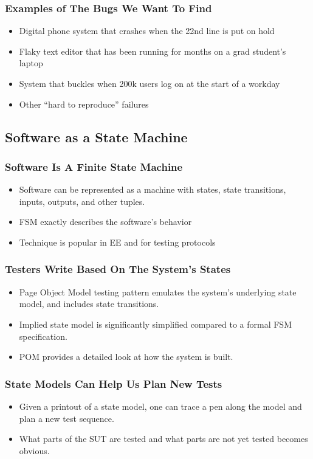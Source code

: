 \begin{frame}
  \frametitle{Examples of The Bugs We Want To Find}
  \begin{itemize}
    \item Digital phone system that crashes when the 22nd line is put on hold
    \item Flaky text editor that has been running for months on a grad student's laptop
    \item System that buckles when 200k users log on at the start of a workday
    \item Other ``hard to reproduce'' failures
  \end{itemize}
\end{frame}

\subsection{Software as a State Machine}
\begin{frame}
  \frametitle{Software Is A Finite State Machine}
  \begin{itemize}
    \item Software can be represented as a machine with states, state transitions, inputs, outputs, and other tuples.
    \item FSM exactly describes the software's behavior
    \item Technique is popular in EE and for testing protocols
  \end{itemize}
\end{frame}

\begin{frame}
  \frametitle{Testers Write Based On The System's States}
  \begin{itemize}
    \item Page Object Model testing pattern emulates the system's underlying state model, and includes state transitions.
    \item Implied state model is significantly simplified compared to a formal FSM specification.
    \item POM provides a detailed look at how the system is built.
  \end{itemize}
\end{frame}

\begin{frame}
  \frametitle{State Models Can Help Us Plan New Tests}
  \begin{itemize}
    \item Given a printout of a state model, one can trace a pen along the model and plan a new test sequence.
    \item What parts of the SUT are tested and what parts are not yet tested becomes obvious.
  \end{itemize}
\end{frame}

